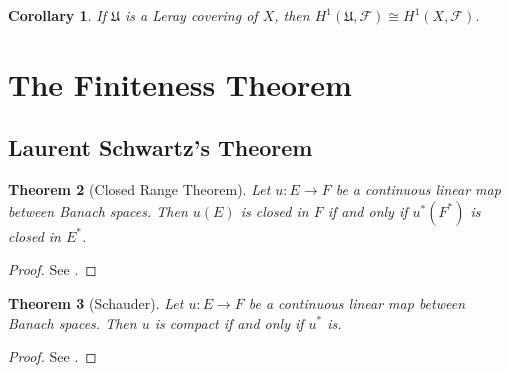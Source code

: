 \documentclass[10pt]{article}
\theoremstyle{thmstyle}
\newtheorem{theorem}{Theorem}[section]
\theoremstyle{defstyle}
\newtheorem{corollary}[theorem]{Corollary}
\newcommand{\frakU}{\mathfrak{U}}
\newcommand{\scrF}{\mathscr{F}}
\begin{document}
\begin{corollary}
    If $\frakU$ is a Leray covering of $X$, then $H^1(\frakU,\scrF)\cong H^1(X,\scrF)$.
\end{corollary}

\section{The Finiteness Theorem}

\subsection{Laurent Schwartz's Theorem}

\begin{theorem}[Closed Range Theorem]
    Let $u: E\to F$ be a continuous linear map between Banach spaces. Then $u(E)$ is closed in $F$ if and only if $u^{\ast}(F^\ast)$ is closed in $E^\ast$.
\end{theorem}
\begin{proof}
    See \cite[Theorem 4.14]{grandpa-rudin}.
\end{proof}

\begin{theorem}[Schauder]
    Let $u: E\to F$ be a continuous linear map between Banach spaces. Then $u$ is compact if and only if $u^\ast$ is.
\end{theorem}
\begin{proof}
    See \cite[Theorem 4.19]{grandpa-rudin}.
\end{proof}
\end{document}
